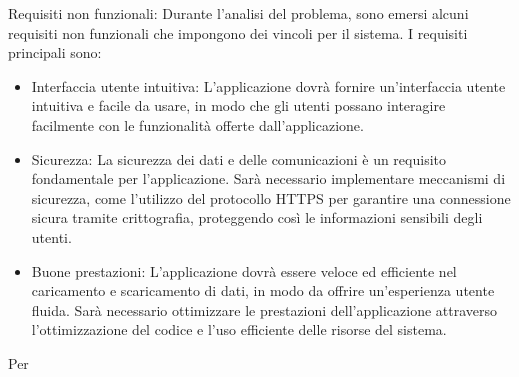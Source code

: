 Requisiti non funzionali:\newline 
Durante l'analisi del problema, sono emersi alcuni requisiti non funzionali che impongono dei vincoli per il sistema. I requisiti principali sono:\newline

\begin{itemize}
	\item Interfaccia utente intuitiva: L'applicazione dovrà fornire un'interfaccia utente intuitiva e facile da usare, in modo che gli utenti possano interagire facilmente con le funzionalità offerte dall'applicazione.
	\item Sicurezza: La sicurezza dei dati e delle comunicazioni è un requisito fondamentale per l'applicazione. Sarà necessario implementare meccanismi di sicurezza, come l'utilizzo del protocollo HTTPS per garantire una connessione sicura tramite crittografia, proteggendo così le informazioni sensibili degli utenti.
	\item
    Buone prestazioni: L'applicazione dovrà essere veloce ed efficiente nel caricamento e scaricamento di dati, in modo da offrire un'esperienza utente fluida. Sarà necessario ottimizzare le prestazioni dell'applicazione attraverso l'ottimizzazione del codice e l'uso efficiente delle risorse del sistema.
\end{itemize}

Per 